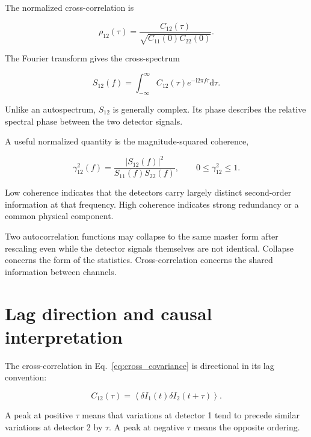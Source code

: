\documentclass[11pt,letterpaper]{article}
\newcommand{\avg}[1]{\left\langle #1 \right\rangle}
\renewcommand{\dd}{\mathrm{d}}
\newcommand{\ii}{\mathrm{i}}
\begin{document}
The normalized cross-correlation is

\begin{equation}
    \rho_{12}(\tau)
    =
    \frac{
    C_{12}(\tau)
    }{
    \sqrt{
    C_{11}(0)C_{22}(0)
    }
    }.
    \label{eq:normalized_cross}
\end{equation}

The Fourier transform gives the cross-spectrum

\begin{equation}
    S_{12}(f)
    =
    \int_{-\infty}^{\infty}
    C_{12}(\tau)e^{-\ii2\pi f\tau}\dd\tau.
\end{equation}

Unlike an autospectrum, $S_{12}$ is generally complex. Its phase describes
the relative spectral phase between the two detector signals.

A useful normalized quantity is the magnitude-squared coherence,

\begin{equation}
    \gamma_{12}^2(f)
    =
    \frac{
    |S_{12}(f)|^2
    }{
    S_{11}(f)S_{22}(f)
    },
    \qquad
    0\leq\gamma_{12}^2\leq 1.
    \label{eq:coherence}
\end{equation}

Low coherence indicates that the detectors carry largely distinct
second-order information at that frequency. High coherence indicates strong
redundancy or a common physical component.

Two autocorrelation functions may collapse to the same master form after
rescaling even while the detector signals themselves are not identical.
Collapse concerns the form of the statistics. Cross-correlation concerns
the shared information between channels.

\section{Lag direction and causal interpretation}

The cross-correlation in Eq.~\eqref{eq:cross_covariance} is directional in
its lag convention:

\begin{equation}
    C_{12}(\tau)
    =
    \avg{
    \delta I_1(t)
    \delta I_2(t+\tau)
    }.
\end{equation}

A peak at positive $\tau$ means that variations at detector 1 tend to
precede similar variations at detector 2 by $\tau$. A peak at negative
$\tau$ means the opposite ordering.
\end{document}
